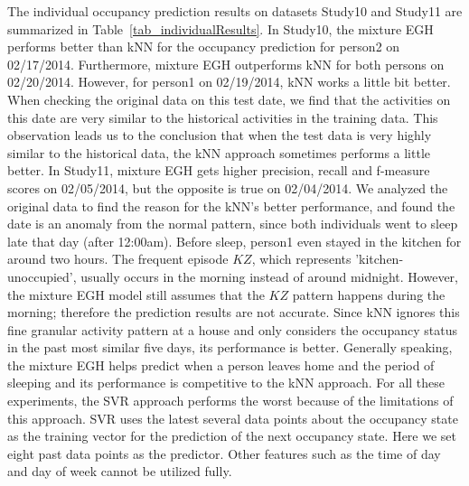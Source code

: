 
The individual occupancy prediction results on datasets Study10 and Study11 are summarized in Table~\ref{tab_individualResults}. 
In Study10,  the mixture EGH performs better than kNN for the occupancy prediction for person2 on 02/17/2014. 
Furthermore, mixture EGH outperforms kNN for both persons on 02/20/2014. 
However, for person1 on 02/19/2014, kNN works a little bit better. 
When checking the original data on this test date, 
we find that the activities on this date are very similar to the historical activities in the training data.
This observation leads us to the conclusion that when the test data is very highly similar to the historical data, 
the kNN approach sometimes performs a little better.  
In Study11, mixture EGH gets higher precision, recall and f-measure scores on 02/05/2014, but the opposite is true on 02/04/2014. 
We analyzed the original data to find the reason for the kNN's better performance, and found the date is an anomaly from the normal pattern, since both individuals went to sleep late that day (after 12:00am).
Before sleep, person1 even stayed in the kitchen for around two hours. 
The frequent episode $KZ$, which represents 'kitchen-unoccupied', 
usually occurs in the morning instead of around midnight. 
However, the mixture EGH model still assumes that the $KZ$ pattern 
happens during the morning; 
therefore the prediction results are not accurate. 
Since kNN ignores this fine granular activity pattern at a house and only considers the occupancy status in the past most similar five days, its performance is better. 
Generally speaking, the mixture EGH helps predict when a person 
leaves home and the period of sleeping and its 
performance is competitive to the kNN approach. 
For all these experiments, the SVR approach performs the worst because 
of the limitations of this approach. 
SVR uses the latest several data points about the occupancy state as the 
training vector for the prediction of the next occupancy state. 
Here we set eight past data points as the predictor. 
Other features such as the time of day and day of week cannot be utilized fully. 

